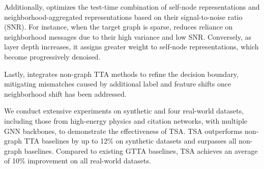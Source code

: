 Additionally, \proj optimizes the test-time combination of self-node representations and neighborhood-aggregated representations based on their signal-to-noise ratio (SNR). For instance, when the target graph is sparse, \proj reduces reliance on neighborhood messages due to their high variance and low SNR. Conversely, as layer depth increases, it assigns greater weight to self-node representations, which become progressively denoised.

Lastly, \proj integrates non-graph TTA methods to refine the decision boundary, mitigating mismatches caused by additional label and feature shifts once neighborhood shift has been addressed.


We conduct extensive experiments on synthetic and four real-world datasets, including those from high-energy physics and citation networks, with multiple GNN backbones, to demonstrate the effectiveness of TSA.   
TSA outperforms non-graph TTA baselines by up to 12\% on synthetic datasets and surpasses all non-graph baselines. Compared to existing GTTA baselines, TSA achieves 
an average of 10\% improvement on all real-world datasets. %




